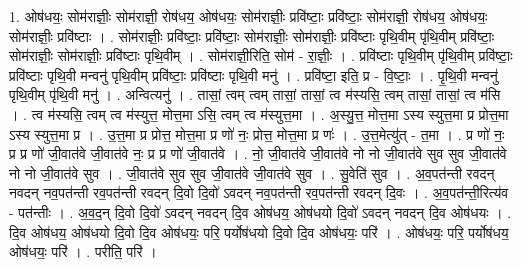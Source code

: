 \documentclass[17pt]{extarticle}
\begin{document}
1. ओष॑धयः॒ सोम॑राज्ञीः॒ सोम॑राज्ञी॒ रोष॑धय॒ ओष॑धयः॒ सोम॑राज्ञीः॒ प्रवि॑ष्टाः॒ प्रवि॑ष्टाः॒ सोम॑राज्ञी॒ रोष॑धय॒ ओष॑धयः॒ सोम॑राज्ञीः॒ प्रवि॑ष्टाः । . सोम॑राज्ञीः॒ प्रवि॑ष्टाः॒ प्रवि॑ष्टाः॒ सोम॑राज्ञीः॒ सोम॑राज्ञीः॒ प्रवि॑ष्टाः पृथि॒वीम् पृ॑थि॒वीम् प्रवि॑ष्टाः॒ सोम॑राज्ञीः॒ सोम॑राज्ञीः॒ प्रवि॑ष्टाः पृथि॒वीम् । . सोम॑राज्ञी॒रिति॒ सोम॑ - रा॒ज्ञीः॒ । . प्रवि॑ष्टाः पृथि॒वीम् पृ॑थि॒वीम् प्रवि॑ष्टाः॒ प्रवि॑ष्टाः पृथि॒वी मन्वनु॑ पृथि॒वीम् प्रवि॑ष्टाः॒ प्रवि॑ष्टाः पृथि॒वी मनु॑ । . प्रवि॑ष्टा॒ इति॒ प्र - वि॒ष्टाः॒ । . पृ॒थि॒वी मन्वनु॑ पृथि॒वीम् पृ॑थि॒वी मनु॑ । . अन्वित्यनु॑ । . तासां॒ त्वम् त्वम् तासां॒ तासां॒ त्व म॑स्यसि॒ त्वम् तासां॒ तासां॒ त्व म॑सि । . त्व म॑स्यसि॒ त्वम् त्व म॑स्युत्त॒ मोत्त॒मा ऽसि॒ त्वम् त्व म॑स्युत्त॒मा । . अ॒स्यु॒त्त॒ मोत्त॒मा ऽस्य स्युत्त॒मा प्र प्रोत्त॒मा ऽस्य स्युत्त॒मा प्र । . उ॒त्त॒मा प्र प्रोत्त॒ मोत्त॒मा प्र णो॑ नः॒ प्रोत्त॒ मोत्त॒मा प्र णः॑ । . उ॒त्त॒मेत्यु॑त् - त॒मा । . प्र णो॑ नः॒ प्र प्र णो॑ जी॒वात॑वे जी॒वात॑वे नः॒ प्र प्र णो॑ जी॒वात॑वे । . नो॒ जी॒वात॑वे जी॒वात॑वे नो नो जी॒वात॑वे सुव सुव जी॒वात॑वे नो नो जी॒वात॑वे सुव । . जी॒वात॑वे सुव सुव जी॒वात॑वे जी॒वात॑वे सुव । . सु॒वेति॑ सुव । . अ॒व॒पत॑न्ती रवदन् नवदन् नव॒पत॑न्ती रव॒पत॑न्ती रवदन् दि॒वो दि॒वो॑ ऽवदन् नव॒पत॑न्ती रव॒पत॑न्ती रवदन् दि॒वः । . अ॒व॒पत॑न्ती॒रित्य॑व - पत॑न्तीः । . अ॒व॒द॒न् दि॒वो दि॒वो॑ ऽवदन् नवदन् दि॒व ओष॑धय॒ ओष॑धयो दि॒वो॑ ऽवदन् नवदन् दि॒व ओष॑धयः । . दि॒व ओष॑धय॒ ओष॑धयो दि॒वो दि॒व ओष॑धयः॒ परि॒ पर्योष॑धयो दि॒वो दि॒व ओष॑धयः॒ परि॑ । . ओष॑धयः॒ परि॒ पर्योष॑धय॒ ओष॑धयः॒ परि॑ । . परीति॒ परि॑ । \newline
\end{document}
